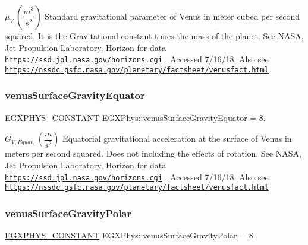 $ \mu_{V} \ (\dfrac{m^3}{s^2})$ Standard gravitational parameter of Venus in meter cubed per second squared. It is the Gravitational constant times the mass of the planet. See N\+A\+SA, Jet Propulsion Laboratory, Horizon for data \href{https://ssd.jpl.nasa.gov/horizons.cgi}{\tt https\+://ssd.\+jpl.\+nasa.\+gov/horizons.\+cgi} . Accessed 7/16/18. Also see \href{https://nssdc.gsfc.nasa.gov/planetary/factsheet/venusfact.html}{\tt https\+://nssdc.\+gsfc.\+nasa.\+gov/planetary/factsheet/venusfact.\+html} \mbox{\label{group___e_g_x_phys-_constants-_astrophysics-_solar_system-_venus-_bulk_gaa8dbde50f4c15891fa640c713f27d6ff}} 
\subsubsection{\texorpdfstring{venus\+Surface\+Gravity\+Equator}{venusSurfaceGravityEquator}}
{\footnotesize\ttfamily \mbox{\hyperlink{group___e_g_x_phys-_constants-_macros_ga76980d288494ce1714c9ac68a95ba702}{E\+G\+X\+P\+H\+Y\+S\+\_\+\+C\+O\+N\+S\+T\+A\+NT}} E\+G\+X\+Phys\+::venus\+Surface\+Gravity\+Equator = 8.}

$ G_{V,Equat.} \ (\dfrac{m}{s^2})$ Equatorial gravitational acceleration at the surface of Venus in meters per second squared. Does not including the effects of rotation. See N\+A\+SA, Jet Propulsion Laboratory, Horizon for data \href{https://ssd.jpl.nasa.gov/horizons.cgi}{\tt https\+://ssd.\+jpl.\+nasa.\+gov/horizons.\+cgi} . Accessed 7/16/18. Also see \href{https://nssdc.gsfc.nasa.gov/planetary/factsheet/venusfact.html}{\tt https\+://nssdc.\+gsfc.\+nasa.\+gov/planetary/factsheet/venusfact.\+html} \mbox{\label{group___e_g_x_phys-_constants-_astrophysics-_solar_system-_venus-_bulk_gae6530375b31eeb2a06adeb17a83e0307}} 
\subsubsection{\texorpdfstring{venus\+Surface\+Gravity\+Polar}{venusSurfaceGravityPolar}}
{\footnotesize\ttfamily \mbox{\hyperlink{group___e_g_x_phys-_constants-_macros_ga76980d288494ce1714c9ac68a95ba702}{E\+G\+X\+P\+H\+Y\+S\+\_\+\+C\+O\+N\+S\+T\+A\+NT}} E\+G\+X\+Phys\+::venus\+Surface\+Gravity\+Polar = 8.}

